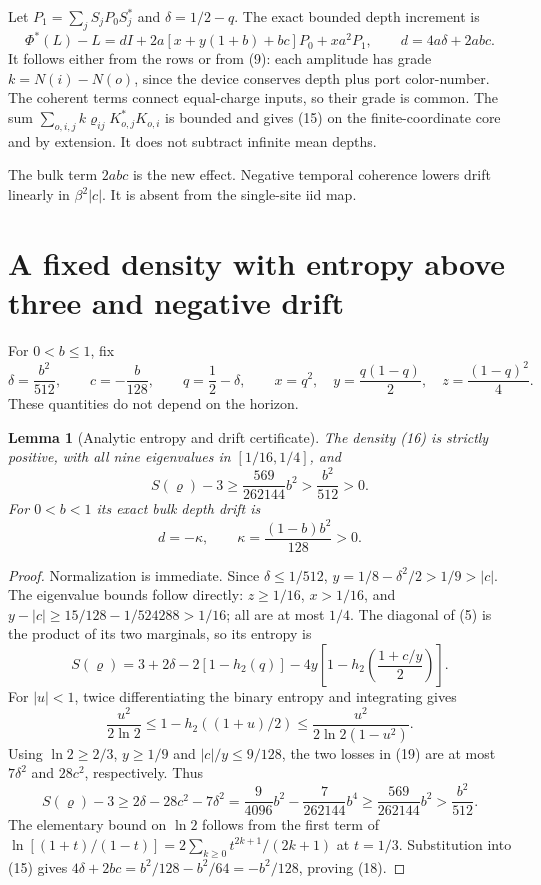 \documentclass[11pt]{article}
\newtheorem{lemma}[theorem]{Lemma}
\begin{document}
Let $P_1=\sum_jS_jP_0S_j^*$ and $\delta=1/2-q$.
The exact bounded depth increment is
\[
 \boxed{\Phi^*(L)-L=dI+2a[x+y(1+b)+bc]P_0+xa^2P_1,\qquad
 d=4a\delta+2ab c.}\tag{15}
\]
It follows either from the rows or from (9): each amplitude has grade
$k=N(i)-N(o)$, since the device conserves depth plus port color-number.
The coherent terms connect equal-charge inputs, so their grade is common.
The sum $\sum_{o,i,j}k\varrho_{ij}K_{o,j}^*K_{o,i}$ is bounded and gives
(15) on the finite-coordinate core and by extension. It does not subtract
infinite mean depths.

The bulk term $2ab c$ is the new effect. Negative temporal coherence lowers
drift linearly in $\beta^2|c|$. It is absent from the single-site iid map.

\section{A fixed density with entropy above three and negative drift}

For $0<b\le1$, fix
\[
 \delta=\frac{b^2}{512},\qquad c=-\frac b{128},\qquad q=\frac12-\delta,
 \qquad x=q^2,\quad y=\frac{q(1-q)}2,\quad z=\frac{(1-q)^2}4.
 \tag{16}
\]
These quantities do not depend on the horizon.

\begin{lemma}[Analytic entropy and drift certificate]\label{lem:seed}
The density (16) is strictly positive, with all nine eigenvalues in
$[1/16,1/4]$, and
\[
 S(\varrho)-3\ge\frac{569}{262144}b^2>\frac{b^2}{512}>0.
 \tag{17}
\]
For $0<b<1$ its exact bulk depth drift is
\[
 d=-\kappa,\qquad \kappa=\frac{(1-b)b^2}{128}>0.
 \tag{18}
\]
\end{lemma}
\begin{proof}
Normalization is immediate. Since $\delta\le1/512$,
$y=1/8-\delta^2/2>1/9>|c|$. The eigenvalue bounds follow directly:
$z\ge1/16$, $x>1/16$, and $y-|c|\ge15/128-1/524288>1/16$;
all are at most $1/4$.
The diagonal of (5) is the product of its two marginals, so its entropy is
\[
 S(\varrho)=3+2\delta-2[1-h_2(q)]
       -4y\left[1-h_2\left(\frac{1+c/y}{2}\right)\right].
 \tag{19}
\]
For $|u|<1$, twice differentiating the binary entropy and integrating gives
\[
 \frac{u^2}{2\ln2}\le1-h_2((1+u)/2)
 \le\frac{u^2}{2\ln2(1-u^2)}.
 \tag{20}
\]
Using $\ln2\ge2/3$, $y\ge1/9$ and $|c|/y\le9/128$, the two losses in
(19) are at most $7\delta^2$ and $28c^2$, respectively. Thus
\[
 S(\varrho)-3\ge2\delta-28c^2-7\delta^2
 =\frac9{4096}b^2-\frac7{262144}b^4
 \ge\frac{569}{262144}b^2>\frac{b^2}{512}.
\]
The elementary bound on $\ln2$ follows from the first term of
$\ln[(1+t)/(1-t)]=2\sum_{k\ge0}t^{2k+1}/(2k+1)$ at $t=1/3$.
Substitution into (15) gives
$4\delta+2bc=b^2/128-b^2/64=-b^2/128$, proving (18).
\end{proof}
\end{document}
